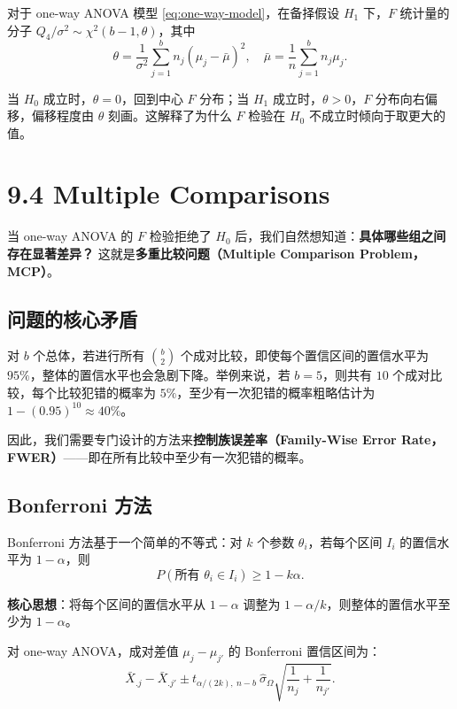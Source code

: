 \begin{example}\label{ex:anova-noncentral}
对于 one-way ANOVA 模型 \eqref{eq:one-way-model}，在备择假设 $H_1$ 下，$F$ 统计量的分子 $Q_4/\sigma^2 \sim \chi^2(b-1, \theta)$，其中
\[
\theta = \frac{1}{\sigma^2}\sum_{j=1}^b n_j (\mu_j - \bar{\mu})^2,\quad
\bar{\mu} = \frac{1}{n}\sum_{j=1}^b n_j \mu_j.
\label{eq:anova-noncentrality}
\]

当 $H_0$ 成立时，$\theta = 0$，回到中心 $F$ 分布；当 $H_1$ 成立时，$\theta > 0$，$F$ 分布向右偏移，偏移程度由 $\theta$ 刻画。这解释了为什么 $F$ 检验在 $H_0$ 不成立时倾向于取更大的值。
\end{example}

\section{9.4 Multiple Comparisons}\label{sec:9.4}

当 one-way ANOVA 的 $F$ 检验拒绝了 $H_0$ 后，我们自然想知道：\textbf{具体哪些组之间存在显著差异？} 这就是\textbf{多重比较问题（Multiple Comparison Problem，MCP）}。

\subsection{问题的核心矛盾}

对 $b$ 个总体，若进行所有 $\binom{b}{2}$ 个成对比较，即使每个置信区间的置信水平为 $95\%$，整体的置信水平也会急剧下降。举例来说，若 $b = 5$，则共有 $10$ 个成对比较，每个比较犯错的概率为 $5\%$，至少有一次犯错的概率粗略估计为 $1 - (0.95)^{10} \approx 40\%$。

因此，我们需要专门设计的方法来\textbf{控制族误差率（Family-Wise Error Rate，FWER）}——即在所有比较中至少有一次犯错的概率。

\subsection{Bonferroni 方法}

Bonferroni 方法基于一个简单的不等式：对 $k$ 个参数 $\theta_i$，若每个区间 $I_i$ 的置信水平为 $1-\alpha$，则
\[
P(\text{所有 } \theta_i \in I_i) \geq 1 - k\alpha.
\label{eq:bonferroni-inequality}
\]

\textbf{核心思想}：将每个区间的置信水平从 $1-\alpha$ 调整为 $1-\alpha/k$，则整体的置信水平至少为 $1-\alpha$。

对 one-way ANOVA，成对差值 $\mu_j - \mu_{j'}$ 的 Bonferroni 置信区间为：
\[
\bar{X}_{.j} - \bar{X}_{.j'} \pm t_{\alpha/(2k),\ n-b}\ \hat{\sigma}_\Omega \sqrt{\frac{1}{n_j} + \frac{1}{n_{j'}}}.
\label{eq:bonferroni-ci}
\]

